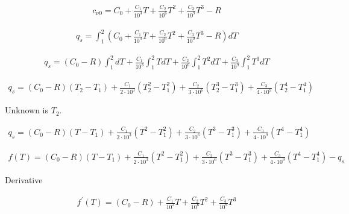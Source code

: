 \documentclass{article}
\begin{document}
	\begin{align*}
		c_{\nu0} = C_0 + \frac{C_1}{10^3}T + \frac{C_2}{10^6}T^2 + \frac{C_3}{10^9}T^3 - R
	\end{align*}

	\begin{align*}
		q_s = \int_1^2 \left(C_0 + \frac{C_1}{10^3}T + \frac{C_2}{10^6}T^2 + \frac{C_3}{10^9}T^3 - R\right)dT
	\end{align*}

	\begin{align*}
		q_s = (C_0 - R)\int_1^2 dT + \frac{C_1}{10^3}\int_1^2 TdT + \frac{C_2}{10^6}\int_1^2 T^2dT + \frac{C_3}{10^9}\int_1^2 T^3dT
	\end{align*}

	\begin{align*}
		q_s = (C_0 - R)(T_2 - T_1) + \frac{C_1}{2\cdot10^3}(T_2^2 - T_1^2) + \frac{C_2}{3\cdot10^6}(T_2^3 - T_1^3) + \frac{C_3}{4\cdot10^9}(T_2^4 - T_1^4)
	\end{align*}

	Unknown is $T_2$.

	\begin{align*}
		q_s = (C_0 - R)(T - T_1) + \frac{C_1}{2\cdot10^3}(T^2 - T_1^2) + \frac{C_2}{3\cdot10^6}(T^3 - T_1^3) + \frac{C_3}{4\cdot10^9}(T^4 - T_1^4)
	\end{align*}

	\begin{align*}
		f(T) = (C_0 - R)(T - T_1) + \frac{C_1}{2\cdot10^3}(T^2 - T_1^2) + \frac{C_2}{3\cdot10^6}(T^3 - T_1^3) + \frac{C_3}{4\cdot10^9}(T^4 - T_1^4) - q_s
	\end{align*}

	Derivative

	\begin{align*}
		f^\prime(T) = (C_0 - R) + \frac{C_1}{10^3}T + \frac{C_2}{10^6}T^2 + \frac{C_3}{10^9}T^3
	\end{align*}

	
	
\end{document}
